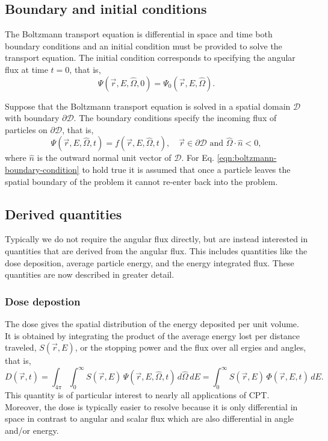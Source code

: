\subsection{Boundary and initial conditions}
The Boltzmann transport equation is differential in space and time both boundary conditions and an initial condition must be provided to solve the transport equation. The initial condition corresponds to specifying the angular flux at time $t = 0$, that is,
\begin{equation}
  \Psi(\vec{r},E,\hat{\Omega},0) = \Psi_0(\vec{r},E,\hat{\Omega}).
\end{equation}

Suppose that the Boltzmann transport equation is solved in a spatial domain $\mathcal{D}$ with boundary $\partial \mathcal{D}$. The boundary conditions specify the incoming flux of particles on $\partial \mathcal{D}$, that is,
\begin{equation} \label{eqn:boltzmann-boundary-condition}
  \Psi(\vec{r},E,\hat{\Omega},t) = f(\vec{r},E,\hat{\Omega},t), \quad \vec{r} \in \partial \mathcal{D} \,\, \text{and} \,\, \hat{\Omega} \cdot \hat{n} < 0,
\end{equation}
where $\hat{n}$ is the outward normal unit vector of $\mathcal{D}$. For Eq. \eqref{eqn:boltzmann-boundary-condition} to hold true it is assumed that once a particle leaves the spatial boundary of the problem it cannot re-enter back into the problem.

\subsection{Derived quantities}
Typically we do not require the angular flux directly, but are instead interested in quantities that are derived from the angular flux. This includes quantities like the dose deposition, average particle energy, and the energy integrated flux. These quantities are now described in greater detail. 

\subsubsection{Dose depostion}
The dose gives the spatial distribution of the energy deposited per unit volume. It is obtained by integrating the product of the average energy lost per distance traveled, $S(\vec{r},E)$, or the stopping power and the flux over all ergies and angles, that is,
\begin{equation}
  D(\vec{r},t) = \int_{4\pi} \int_{0}^{\infty} S(\vec{r},E) \, \Psi(\vec{r},E,\hat{\Omega},t) \, d \hat{\Omega} \, dE = \int_{0}^{\infty} S(\vec{r},E) \, \Phi(\vec{r},E,t) \, dE.
\end{equation}   
This quantity is of particular interest to nearly all applications of CPT. Moreover, the dose is typically easier to resolve because it is only differential in space in contrast to angular and scalar flux which are also differential in angle and/or energy.

